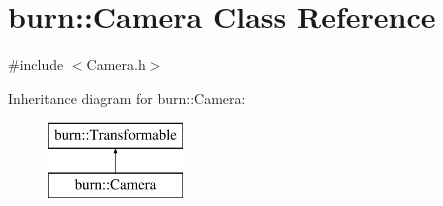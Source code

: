\hypertarget{classburn_1_1_camera}{\section{burn\-:\-:Camera Class Reference}
\label{classburn_1_1_camera}
}


{\ttfamily \#include $<$Camera.\-h$>$}

Inheritance diagram for burn\-:\-:Camera\-:\begin{figure}[H]
\begin{center}
\leavevmode
\includegraphics[height=2.000000cm]{classburn_1_1_camera}
\end{center}
\end{figure}
